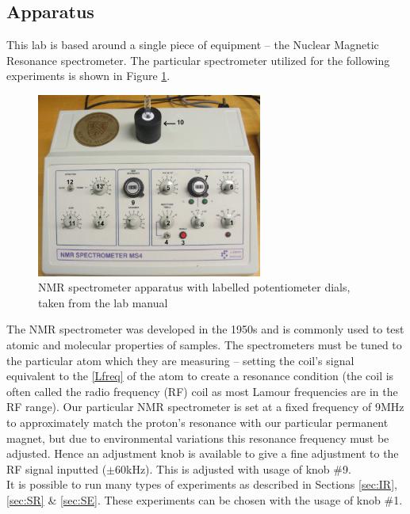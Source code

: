 \subsection{Apparatus}

This lab is based around a single piece of equipment -- the Nuclear Magnetic Resonance spectrometer. The particular spectrometer utilized for the following experiments is shown in Figure \ref{fig:apparatus}.

\begin{figure}[H]
    \centering
    \includegraphics[width=0.66\textwidth]{figures/apparatus.PNG}
    \caption{NMR spectrometer apparatus with labelled potentiometer dials, taken from the lab manual}
    \label{fig:apparatus}
\end{figure}

The NMR spectrometer was developed in the 1950s and is commonly used to test atomic and molecular properties of samples. The spectrometers must be tuned to the particular atom which they are measuring -- setting the coil's signal equivalent to the \ref{Lfreq} of the atom to create a resonance condition (the coil is often called the radio frequency (RF) coil as most Lamour frequencies are in the RF range).  Our particular NMR spectrometer is set at a fixed frequency of 9MHz to approximately match the proton's resonance with our particular permanent magnet, but due to environmental variations this resonance frequency must be adjusted. Hence an adjustment knob is available to give a fine adjustment to the RF signal inputted ($\pm$60kHz). This is adjusted with usage of knob \#9.\\

It is possible to run many types of experiments as described in Sections \ref{sec:IR}, \ref{sec:SR} \& \ref{sec:SE}. These experiments can be chosen with the usage of knob \#1.\\

